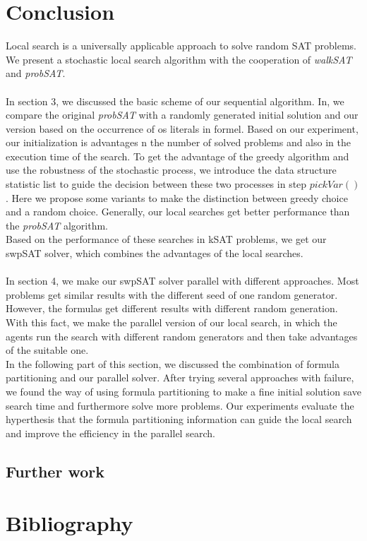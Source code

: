 \documentclass[12pt,a4paper,twoside]{scrartcl}
\numberwithin{equation}{section}
\begin{document}
\section{Conclusion}

\label{sec:conc}
Local search is a universally applicable approach to solve random SAT problems. We present a stochastic local search algorithm with the cooperation of \emph{walkSAT} and \emph{probSAT}.\\
\\
In section 3, we discussed the basic scheme of our sequential algorithm. In, we compare the original \emph{probSAT} with a randomly generated initial solution and our version based on the occurrence of os literals in formel. Based on our experiment, our initialization is advantages n the number of solved problems and also in the execution time of the search. To get the advantage of the greedy algorithm and use the robustness of the stochastic process, we introduce the data structure statistic list to guide the decision between these two processes in step $pickVar()$. Here we propose some variants to make the distinction between greedy choice and a random choice. Generally, our local searches get better performance than the \emph{probSAT} algorithm. \\
Based on the performance of these searches in kSAT problems, we get our swpSAT solver, which combines the advantages of the local searches. \\
\\
In section 4, we make our swpSAT solver parallel with different approaches. Most problems get similar results with the different seed of one random generator. However, the formulas get different results with different random generation. With this fact, we make the parallel version of our local search, in which the agents run the search with different random generators and then take advantages of the suitable one.\\
In the following part of this section, we discussed the combination of formula partitioning and our parallel solver. After trying several approaches with failure, we found the way of using formula partitioning to make a fine initial solution save search time and furthermore solve more problems. Our experiments evaluate the hyperthesis that the formula partitioning information can guide the local search and improve the efficiency in the parallel search.
\subsection{Further work}
\clearpage
\section{Bibliography}


\end{document}
